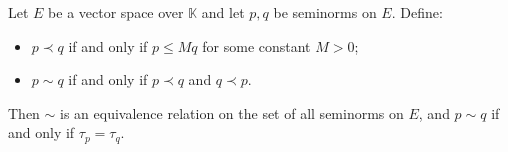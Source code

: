 Let $E$ be a vector space over $\mathbb{K}$ and let $p, q$ be seminorms on $E$. Define:
\begin{itemize}
\item $p \prec q$ if and only if $p \leq M q$ for some constant $M > 0$;
\item $p \sim q$ if and only if $p \prec q$ and $q \prec p$.
\end{itemize}
Then $\sim$ is an equivalence relation on the set of all seminorms on $E$, and $p \sim q$ if and only if $\tau_p = \tau_q$.
